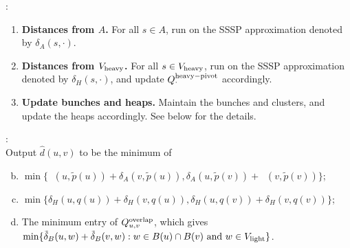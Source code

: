 \documentclass[11pt]{article}
\theoremstyle{definition}
\theoremstyle{remark}
\DeclareMathOperator{\dLNbunch}{\delta_{\tilde{B}}}
\begin{document}
\noindent{}:
\begin{enumerate}[(1)]
     \item \textbf{Distances from $A$.} For all $s\in A$, run  on the SSSP approximation denoted by $\delta_A(s,\cdot)$. %
    \item \textbf{Distances from $V_{\rm{heavy}}$.} For all $s\in V_{\rm{heavy}}$, run  on the SSSP approximation denoted by $\delta_H(s,\cdot)$, and update $Q^{\rm{heavy-pivot}}_{\cdot}$ accordingly. 
    \item \textbf{Update bunches and heaps.} Maintain the bunches and clusters, and update the heaps accordingly. See below for the details.  \label{step:update3_moved}
\end{enumerate}

\noindent{}:\\
    Output $\hat d(u, v)$ to be the minimum of 
    \begin{enumerate}[(a)]\setcounter{enumi}{1}
         \item $\min\{ \dLNbunch(u,\tilde p(u))+\delta_A(v,\tilde p(u)),\delta_A(u,\tilde p(v))+\dLNbunch(v,\tilde p(v))\}$;\label{step:pivotW}
        \item $\min\{ \delta_H(u,q(u))+\delta_H(v,q(u)),\delta_H(u,q(v))+\delta_H(v,q(v))\}$;\label{step:quvitW}
        \item The minimum entry of $Q^{\rm{overlap}}_{u,v}$, which gives $\min\{\tilde \delta_B(u,w)+\tilde \delta_B(v,w) : w\in B(u)\cap B(v) \text{ and }w\in V_{\rm{light}}\}$. \label{step:w_light} 
    \end{enumerate}
    
\end{document}
